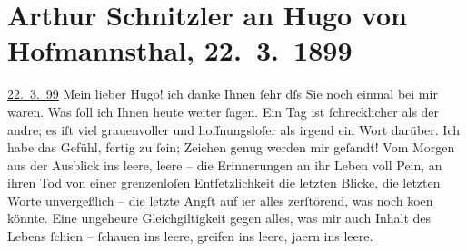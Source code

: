 

         
         \renewcommand{\erwaehntePersonen}{Personen: Otto Brahm, Caroline Burger, Georg Hirschfeld, Hugo von Hofmannsthal, Marie Reinhard, Carl Reinhard, Therese Reinhard}
         \renewcommand{\erwaehnteOrte}{Orte: Berlin, Graz, Wien}
         \renewcommand{\erwaehnteWerke}{}
               \section[Arthur Schnitzler an Hugo von Hofmannsthal, 22. 3. 1899]{ Arthur Schnitzler an Hugo von Hofmannsthal, 22. 3. 1899}\nopagebreak{}\rehead{ }\begin{ledgroupsized}[t]{13cm}\normalsize\beginnumbering{} \toendnotes[C]{\smallbreak\pagebreak[2]} 
\toendnotes[C]{\smallbreak}\pstart
           \raggedleft{}{\pb}\uline{22. 3. 99}\pend
           \pstart
           Mein lieber Hugo! ich danke Ihnen ſehr dſs Sie noch einmal bei mir
               waren. Was ſoll ich Ihnen heute weiter ſagen. Ein Tag ist ſchrecklicher als der
               andre; es iſt viel grauenvoller und hoffnungsloſer als irgend ein Wort darüber. Ich
               habe das Gefühl, fertig zu ſein; Zeichen genug werden mir geſandt! Vom Morgen aus der
               Ausblick ins leere, {\pb}leere – die Erinnerungen an ihr Leben voll Pein, an ihren
               Tod von einer grenzenloſen Entſetzlichkeit{\dotstwo} die letzten
               Blicke, die letzten Worte unvergeßlich – die letzte Angſt auf i{\geminationm}er alles zerſtörend, was noch ko{\geminationm}en könnte. Eine ungeheure Gleichgiltigkeit gegen alles,
               was mir auch Inhalt des Lebens ſchien – ſchauen ins leere, {\pb}greifen ins leere, ja{\geminationm}ern ins leere.\pend

\end{ledgroupsized}
